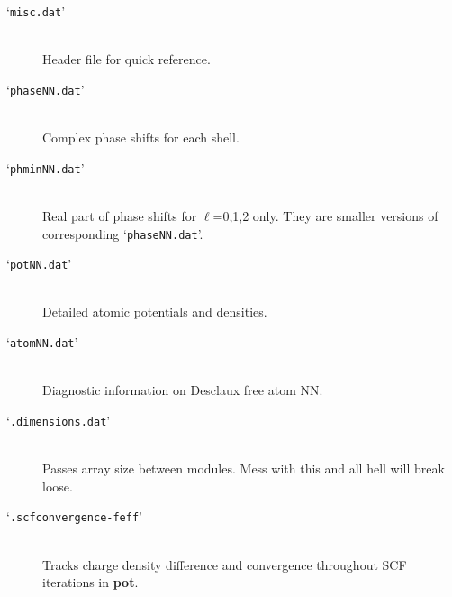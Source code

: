 \documentclass[11pt,oneside]{report} %
\newcommand{\file}[1]{`\texttt{#1}'}
\newcommand{\module}[1]{\textrm{\bf{#1}}}
\begin{document}
\begin{latexonly}
\begin{description}
\item[\file{misc.dat}]\hfill\\ Header file for quick reference.
\item[\file{phaseNN.dat}] \hfill\\ Complex phase shifts for each
  shell.
\item[\file{phminNN.dat}] \hfill\\ Real part of phase shifts for
  $\ell$=0,1,2 only. They are smaller versions of corresponding
  \file{phaseNN.dat}.
\item[\file{potNN.dat}]\hfill\\  Detailed atomic potentials and
  densities.
\item[\file{atomNN.dat}] \hfill\\ Diagnostic information on Desclaux
  free atom NN.
  \item[\file{.dimensions.dat}] \hfill\\ Passes array size between modules.  Mess with this and all
  hell will break loose.
  \item[\file{.scfconvergence-feff}] \hfill\\ Tracks charge density difference and convergence throughout SCF iterations in \module{pot}.
\end{description}



\end{latexonly}
\end{document}
